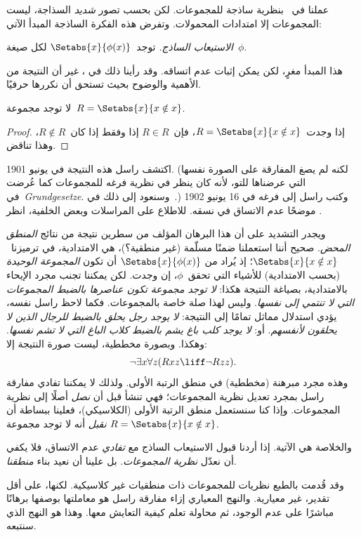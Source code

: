 \documentclass[../../../include/open-logic-section]{subfiles}
\begin{document}

عملنا في~ بنظرية ساذجة للمجموعات. لكن بحسب تصور
\emph{شديد} السذاجة، ليست المجموعات إلا امتدادات المحمولات. وتفرض هذه
الفكرة الساذجة المبدأ الآتي:

\begin{defish}
  \emph{الاستيعاب الساذج.} توجد~$\Setabs{x}{\phi(x)}$ لكل صيغة~$\phi$.
\end{defish}

هذا المبدأ مغرٍ، لكن يمكن إثبات عدم اتساقه. وقد رأينا ذلك في
، غير أن النتيجة من الأهمية والوضوح بحيث
تستحق أن نكررها حرفيًا.

\begin{thm}
لا توجد مجموعة~$R = \Setabs{x}{x \notin x}$.
\end{thm}

\begin{proof}
إذا وجدت~$R = \Setabs{x}{x \notin x}$، فإن~$R \in R$ إذا وفقط إذا
كان~$R \notin R$، وهذا تناقض.
\end{proof}

اكتشف راسل هذه النتيجة في يونيو 1901. (لكنه لم يصغ المفارقة على الصورة
نفسها التي عرضناها للتو، لأنه كان ينظر في نظرية فرغه للمجموعات كما
عُرضت في~\emph{Grundgesetze}. وسنعود إلى ذلك في~.)
وكتب راسل إلى فرغه في 16 يونيو 1902 موضحًا عدم الاتساق في نسقه.
للاطلاع على المراسلات وبعض الخلفية، انظر
\citet[pp.~124--8]{Heijenoort1967}.

ويجدر التشديد على أن هذا البرهان المؤلف من سطرين نتيجة من نتائج
\emph{المنطق المحض}. صحيح أننا استعملنا ضمنًا مسلّمة (غير منطقية؟)،
هي الامتدادية، في ترميزنا~$\Setabs{x}{x \notin x}$؛ إذ يُراد من
$\Setabs{x}{\phi(x)}$ أن تكون \emph{المجموعة الوحيدة} (بحسب
الامتدادية) للأشياء التي تحقق~$\phi$، إن وجدت. لكن يمكننا تجنب مجرد
الإيحاء بالامتدادية، بصياغة النتيجة هكذا:
\emph{لا توجد مجموعة تكون عناصرها بالضبط المجموعات التي لا تنتمي إلى
نفسها}. وليس لهذا صلة خاصة بالمجموعات. فكما لاحظ راسل نفسه، يؤدي
استدلال مماثل تمامًا إلى النتيجة: \emph{لا يوجد رجل يحلق بالضبط للرجال
الذين لا يحلقون لأنفسهم}. أو: \emph{لا يوجد كلب باغ يشم بالضبط كلاب
الباغ التي لا تشم نفسها}. وهكذا. وبصورة مخططية، ليست صورة النتيجة إلا:
\[
\lnot \exists x \forall z(Rxz \liff \lnot R zz).
\]
وهذه مجرد مبرهنة (مخططية) في منطق الرتبة الأولى. ولذلك لا يمكننا تفادي
مفارقة راسل بمجرد تعديل نظرية المجموعات؛ فهي تنشأ قبل أن \emph{نصل}
أصلًا إلى نظرية المجموعات. وإذا كنا سنستعمل منطق الرتبة الأولى
(الكلاسيكي)، فعلينا ببساطة أن \emph{نقبل} أنه لا توجد مجموعة
$R = \Setabs{x}{x\notin x}$.

والخلاصة هي الآتية. إذا أردنا قبول الاستيعاب الساذج مع
\emph{تفادي} عدم الاتساق، فلا يكفي أن نعدّل \emph{نظرية المجموعات}.
بل علينا أن نعيد بناء \emph{منطقنا}.

وقد قُدمت بالطبع نظريات للمجموعات ذات منطقيات غير كلاسيكية. لكنها،
على أقل تقدير، غير معيارية. والنهج المعياري إزاء مفارقة راسل هو معاملتها
بوصفها برهانًا مباشرًا على عدم الوجود، ثم محاولة تعلم كيفية التعايش
معها. وهذا هو النهج الذي سنتبعه.
\end{document}
